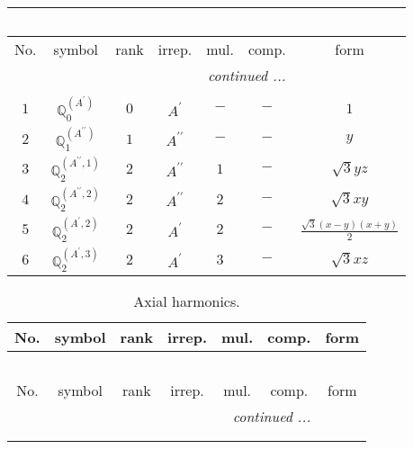 \documentclass[fleqn,10pt,landscape]{article}
\begin{document}
\begin{itemize}
\begin{center}
\begin{longtable}{ccccccc}
\multicolumn{6}{l}{\tablename\ \thetable{}} \\
 \hline \hline
No. & symbol & rank & irrep. & mul. & comp. & form \\ \hline \endhead

 \hline \hline
\multicolumn{6}{r}{\footnotesize\it continued ...} \\ \endfoot

 \hline \hline
\multicolumn{6}{r}{} \\ \endlastfoot

$ 1 $ & $ \mathbb{Q}_{0}^{(A^{\prime})} $ & $ 0 $ & $ A^{\prime} $ & $ - $ & $ - $ & $ 1 $ \\ \hline
$ 2 $ & $ \mathbb{Q}_{1}^{(A^{\prime\prime})} $ & $ 1 $ & $ A^{\prime\prime} $ & $ - $ & $ - $ & $ y $ \\ \hline
$ 3 $ & $ \mathbb{Q}_{2}^{(A^{\prime\prime},1)} $ & $ 2 $ & $ A^{\prime\prime} $ & $ 1 $ & $ - $ & $ \sqrt{3} y z $ \\
$ 4 $ & $ \mathbb{Q}_{2}^{(A^{\prime\prime},2)} $ & $ 2 $ & $ A^{\prime\prime} $ & $ 2 $ & $ - $ & $ \sqrt{3} x y $ \\
$ 5 $ & $ \mathbb{Q}_{2}^{(A^{\prime},2)} $ & $ 2 $ & $ A^{\prime} $ & $ 2 $ & $ - $ & $ \frac{\sqrt{3} \left(x - y\right) \left(x + y\right)}{2} $ \\
$ 6 $ & $ \mathbb{Q}_{2}^{(A^{\prime},3)} $ & $ 2 $ & $ A^{\prime} $ & $ 3 $ & $ - $ & $ \sqrt{3} x z $ \\
\end{longtable}
\end{center}
\begin{center}
\renewcommand{\arraystretch}{1.3}
\begin{longtable}{ccccccc}
\caption{Axial harmonics.}
 \\
 \hline \hline
No. & symbol & rank & irrep. & mul. & comp. & form \\ \hline \endfirsthead

\multicolumn{6}{l}{\tablename\ \thetable{}} \\
 \hline \hline
No. & symbol & rank & irrep. & mul. & comp. & form \\ \hline \endhead

 \hline \hline
\multicolumn{6}{r}{\footnotesize\it continued ...} \\ \endfoot

 \hline \hline
\multicolumn{6}{r}{} \\ \endlastfoot


\end{longtable}
\end{center}
\end{itemize}
\end{document}
